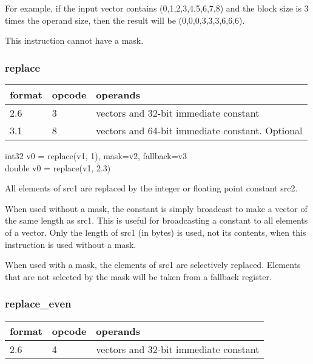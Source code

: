 \documentclass[forwardcom.tex]{subfiles}
\begin{document}
For example, if the input vector contains (0,1,2,3,4,5,6,7,8) and the block size is 3 times the operand size, then the result will be (0,0,0,3,3,3,6,6,6).
\vspace{2mm}

This instruction cannot have a mask.

\subsubsection{replace}
\label{table:replaceInstruction}
\begin{tabular}{|p{12mm}|p{12mm}|p{110mm}|}
\hline
\bfseries format & \bfseries opcode & \bfseries operands \\ \hline
2.6 & 3 & vectors and 32-bit immediate constant \\ \hline
3.1 & 8 & vectors and 64-bit immediate constant. Optional \\ \hline
\end{tabular}
\vspace{2mm}

int32 v0 = replace(v1, 1), mask=v2, fallback=v3\\
double v0 = replace(v1, 2.3)
\vspace{2mm}

All elements of src1 are replaced by the integer or floating point constant src2.
\vspace{2mm}

When used without a mask, the constant is simply broadcast to make a vector of the same length as src1. This is useful for broadcasting a constant to all elements of a vector. Only the length of src1 (in bytes) is used, not its contents, when this instruction is used without a mask.
\vspace{2mm}

When used with a mask, the elements of src1 are selectively replaced. Elements that are not selected by the mask will be taken from a fallback register.

\subsubsection{replace\_even}
\label{table:replaceEvenInstruction}
\begin{tabular}{|p{12mm}|p{12mm}|p{110mm}|}
\hline
\bfseries format & \bfseries opcode & \bfseries operands \\ \hline
2.6 & 4 & vectors and 32-bit immediate constant \\ \hline
\end{tabular}
\vspace{2mm}
\end{document}
